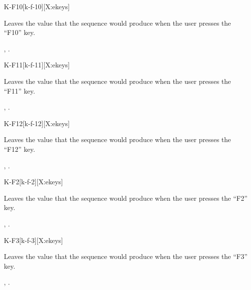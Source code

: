 \begin{worddef}{}{K-F10}[k-f-10][X:ekeys]
\item {}

	Leaves the value  that the sequence 
	 would produce when the user presses the
	``F10'' key.

\see {},
	.
\end{worddef}


\begin{worddef}{}{K-F11}[k-f-11][X:ekeys]
\item {}

	Leaves the value  that the sequence 
	 would produce when the user presses the
	``F11'' key.

\see {},
	.
\end{worddef}


\begin{worddef}{}{K-F12}[k-f-12][X:ekeys]
\item {}

	Leaves the value  that the sequence 
	 would produce when the user presses the
	``F12'' key.

\see {},
	.
\end{worddef}


\begin{worddef}{}{K-F2}[k-f-2][X:ekeys]
\item {}

	Leaves the value  that the sequence 
	 would produce when the user presses the
	``F2'' key.

\see {},
	.
\end{worddef}


\begin{worddef}{}{K-F3}[k-f-3][X:ekeys]
\item {}

	Leaves the value  that the sequence 
	 would produce when the user presses the
	``F3'' key.

\see {},
	.
\end{worddef}



